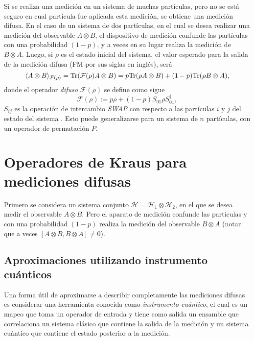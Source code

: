 Si se  realiza una  medición en un sistema de muchas partículas, pero no se está seguro en cual partícula  fue aplicada esta medición, se obtiene una medición difusa. En el caso de un sistema de dos partículas, en el cual se desea realizar una medición del observable $A\otimes B$, el dispositivo de medición confunde las partículas con una probabilidad $(1-p)$, y a veces en su lugar realiza la medición de $B\otimes A$. Luego, si $\rho$ es el estado inicial del sistema, el valor esperado para la salida de la medición difusa (FM por sus siglas en inglés), será 
\begin{equation}
    \langle A\otimes B\rangle_{\mathcal{F}(\rho)}={\rm Tr}(\mathcal{F}(\rho)A\otimes B)=p{\rm Tr}(\rho A\otimes B)+(1-p){\rm Tr}(\rho B\otimes A),
\end{equation}
donde el operador \textit{difuso }$\mathcal{F}(\rho)$ se define como sigue 
\begin{equation}\label{operador_difuso}
    \mathcal{F}(\rho):=p\rho+(1-p)S_{01}\rho S_{01}^\dagger,
\end{equation}
$S_{ij}$ es la operación de intercambio \textit{SWAP} con respecto a las partículas $i$ y $j$ del estado del sistema {\cite{Pineda_2021}}. Esto puede generalizarse para un sistema de $n$ partículas, con un operador de permutación $P$.%

 \section{Operadores de Kraus para mediciones difusas}

 Primero se considera un sistema conjunto $\mathcal{H}=\mathcal{H}_1\otimes \mathcal{H}_2$, en el que se desea medir el observable $A\otimes B$. Pero el aparato de medición confunde las partículas y con una probabilidad $(1-p) $ realiza la medición del observable $B\otimes A$ (notar que a veces $[A\otimes B,B\otimes A]\ne 0$). 

   
\subsection{Aproximaciones utilizando instrumento cuánticos}

Una forma útil de aproximarse a describir completamente las mediciones difusas es considerar una herramienta conocida como \textit{instrumento cuántico}, el cual es un mapeo que toma un operador de entrada y tiene como salida un ensamble que correlaciona un sistema clásico que contiene la salida de la medición y un sistema cuántico que contiene el estado posterior a la medición. 


